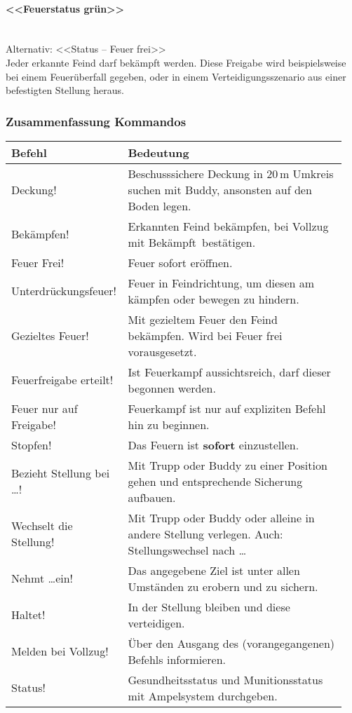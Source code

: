 \paragraph*{<<Feuerstatus grün>>}\ \\
	Alternativ: <<Status -- Feuer frei>>\hfil\\
	Jeder erkannte Feind darf bekämpft werden. Diese Freigabe wird beispielsweise bei einem Feuerüberfall gegeben, oder in einem Verteidigungsszenario aus einer befestigten Stellung heraus.

\pagebreak	
\subsubsection{Zusammenfassung Kommandos}
	\begin{longtable}{p{0.3\linewidth}p{0.65\linewidth}} 
		\toprule
		\textbf{Befehl} & \textbf{Bedeutung}\\
		\midrule
		Deckung! & Beschusssichere Deckung in 20\,m Umkreis suchen mit Buddy, ansonsten auf den Boden legen.\\
		Bekämpfen! & Erkannten Feind bekämpfen, bei Vollzug mit \glqq Bekämpft\grqq\, bestätigen.\\
		Feuer Frei! & Feuer sofort eröffnen.\\
		Unterdrückungsfeuer! & Feuer in Feindrichtung, um diesen am kämpfen oder bewegen zu hindern.\\
		Gezieltes Feuer! & Mit gezieltem Feuer den Feind bekämpfen. Wird bei \glqq Feuer frei\grqq\, vorausgesetzt.\\
		Feuerfreigabe erteilt! & Ist Feuerkampf aussichtsreich, darf dieser begonnen werden.\\
		Feuer nur auf Freigabe! & Feuerkampf ist nur auf expliziten Befehl hin zu beginnen.\\
		Stopfen! & Das Feuern ist \textbf{sofort} einzustellen.\\
		Bezieht Stellung bei \dots ! & Mit Trupp oder Buddy zu einer Position gehen und entsprechende Sicherung aufbauen.\\
		Wechselt die Stellung! & Mit Trupp oder Buddy oder alleine in andere Stellung verlegen. Auch: \glqq Stellungswechsel nach \dots\grqq\\
		Nehmt \dots ein! & Das angegebene Ziel ist unter allen Umständen zu erobern und zu sichern.\\
		Haltet! & In der Stellung bleiben und diese verteidigen.\\
		Melden bei Vollzug! & Über den Ausgang des (vorangegangenen) Befehls informieren. \\
		Status! & Gesundheitsstatus und Munitionsstatus mit Ampelsystem durchgeben.\\
		\bottomrule
	\end{longtable}
